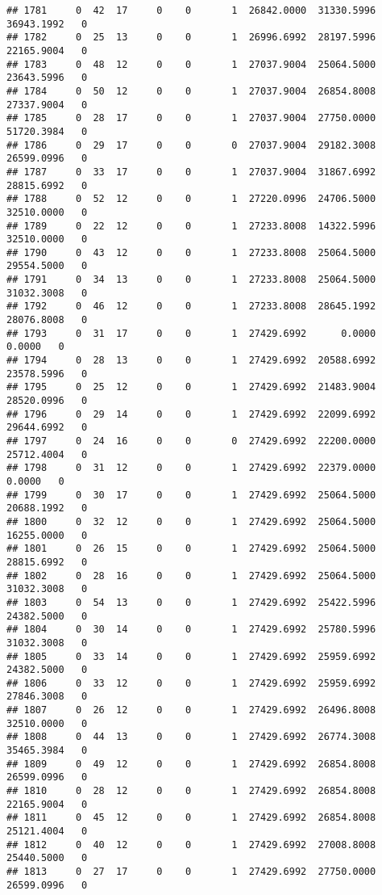 \documentclass[
]{article}
\begin{document}
\begin{enumerate}
\begin{verbatim}
## 1781     0  42  17     0    0       1  26842.0000  31330.5996  36943.1992   0
## 1782     0  25  13     0    0       1  26996.6992  28197.5996  22165.9004   0
## 1783     0  48  12     0    0       1  27037.9004  25064.5000  23643.5996   0
## 1784     0  50  12     0    0       1  27037.9004  26854.8008  27337.9004   0
## 1785     0  28  17     0    0       1  27037.9004  27750.0000  51720.3984   0
## 1786     0  29  17     0    0       0  27037.9004  29182.3008  26599.0996   0
## 1787     0  33  17     0    0       1  27037.9004  31867.6992  28815.6992   0
## 1788     0  52  12     0    0       1  27220.0996  24706.5000  32510.0000   0
## 1789     0  22  12     0    0       1  27233.8008  14322.5996  32510.0000   0
## 1790     0  43  12     0    0       1  27233.8008  25064.5000  29554.5000   0
## 1791     0  34  13     0    0       1  27233.8008  25064.5000  31032.3008   0
## 1792     0  46  12     0    0       1  27233.8008  28645.1992  28076.8008   0
## 1793     0  31  17     0    0       1  27429.6992      0.0000      0.0000   0
## 1794     0  28  13     0    0       1  27429.6992  20588.6992  23578.5996   0
## 1795     0  25  12     0    0       1  27429.6992  21483.9004  28520.0996   0
## 1796     0  29  14     0    0       1  27429.6992  22099.6992  29644.6992   0
## 1797     0  24  16     0    0       0  27429.6992  22200.0000  25712.4004   0
## 1798     0  31  12     0    0       1  27429.6992  22379.0000      0.0000   0
## 1799     0  30  17     0    0       1  27429.6992  25064.5000  20688.1992   0
## 1800     0  32  12     0    0       1  27429.6992  25064.5000  16255.0000   0
## 1801     0  26  15     0    0       1  27429.6992  25064.5000  28815.6992   0
## 1802     0  28  16     0    0       1  27429.6992  25064.5000  31032.3008   0
## 1803     0  54  13     0    0       1  27429.6992  25422.5996  24382.5000   0
## 1804     0  30  14     0    0       1  27429.6992  25780.5996  31032.3008   0
## 1805     0  33  14     0    0       1  27429.6992  25959.6992  24382.5000   0
## 1806     0  33  12     0    0       1  27429.6992  25959.6992  27846.3008   0
## 1807     0  26  12     0    0       1  27429.6992  26496.8008  32510.0000   0
## 1808     0  44  13     0    0       1  27429.6992  26774.3008  35465.3984   0
## 1809     0  49  12     0    0       1  27429.6992  26854.8008  26599.0996   0
## 1810     0  28  12     0    0       1  27429.6992  26854.8008  22165.9004   0
## 1811     0  45  12     0    0       1  27429.6992  26854.8008  25121.4004   0
## 1812     0  40  12     0    0       1  27429.6992  27008.8008  25440.5000   0
## 1813     0  27  17     0    0       1  27429.6992  27750.0000  26599.0996   0

\end{verbatim}
\end{enumerate}
\end{document}
